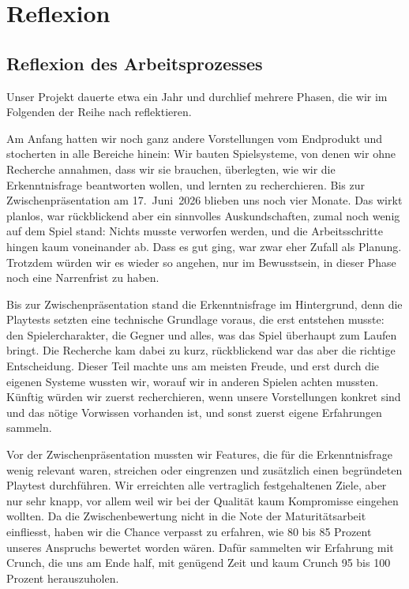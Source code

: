\documentclass[../Main.tex]{subfiles}
\begin{document}
\section{Reflexion} \label{sec:Reflexion}

\subsection{Reflexion des Arbeitsprozesses}

Unser Projekt dauerte etwa ein Jahr und durchlief mehrere Phasen, die wir im Folgenden der Reihe nach reflektieren.

Am Anfang hatten wir noch ganz andere Vorstellungen vom Endprodukt und stocherten in alle Bereiche hinein: Wir bauten Spielsysteme, von denen wir ohne Recherche annahmen, dass wir sie brauchen, überlegten, wie wir die Erkenntnisfrage beantworten wollen, und lernten zu recherchieren. Bis zur Zwischenpräsentation am 17.~Juni~2026 blieben uns noch vier Monate. Das wirkt planlos, war rückblickend aber ein sinnvolles Auskundschaften, zumal noch wenig auf dem Spiel stand: Nichts musste verworfen werden, und die Arbeitsschritte hingen kaum voneinander ab. Dass es gut ging, war zwar eher Zufall als Planung. Trotzdem würden wir es wieder so angehen, nur im Bewusstsein, in dieser Phase noch eine Narrenfrist zu haben.

Bis zur Zwischenpräsentation stand die Erkenntnisfrage im Hintergrund, denn die Playtests setzten eine technische Grundlage voraus, die erst entstehen musste: den Spielercharakter, die Gegner und alles, was das Spiel überhaupt zum Laufen bringt. Die Recherche kam dabei zu kurz, rückblickend war das aber die richtige Entscheidung. Dieser Teil machte uns am meisten Freude, und erst durch die eigenen Systeme wussten wir, worauf wir in anderen Spielen achten mussten. Künftig würden wir zuerst recherchieren, wenn unsere Vorstellungen konkret sind und das nötige Vorwissen vorhanden ist, und sonst zuerst eigene Erfahrungen sammeln.

Vor der Zwischenpräsentation mussten wir Features, die für die Erkenntnisfrage wenig relevant waren, streichen oder eingrenzen und zusätzlich einen begründeten Playtest durchführen. Wir erreichten alle vertraglich festgehaltenen Ziele, aber nur sehr knapp, vor allem weil wir bei der Qualität kaum Kompromisse eingehen wollten. Da die Zwischenbewertung nicht in die Note der Maturitätsarbeit einfliesst, haben wir die Chance verpasst zu erfahren, wie 80 bis 85 Prozent unseres Anspruchs bewertet worden wären. Dafür sammelten wir Erfahrung mit Crunch, die uns am Ende half, mit genügend Zeit und kaum Crunch 95 bis 100 Prozent herauszuholen.
\end{document}
